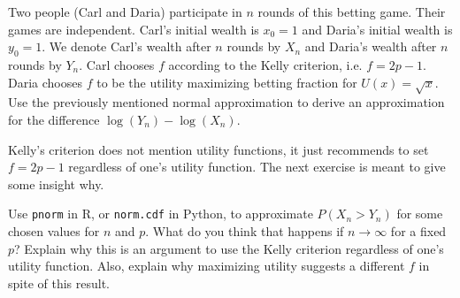 \begin{exercise}
Two people (Carl and Daria) participate in $n$ rounds of this betting game. Their games are independent. Carl's initial wealth is $x_0 = 1$ and Daria's initial wealth is $y_0 = 1$. We denote Carl's wealth after $n$ rounds by $X_n$ and Daria's wealth after $n$ rounds by $Y_n$. Carl chooses $f$ according to the Kelly criterion, i.e. $f = 2p-1$.  Daria chooses $f$ to be the  utility maximizing betting fraction for  $U(x) = \sqrt{x}$.
Use the previously mentioned normal approximation to derive an approximation for the difference $\log(Y_n) - \log(X_n)$.
\end{exercise}

Kelly's criterion does not mention utility functions, it just recommends to set $f = 2p-1$ regardless of one's utility function. The next exercise is meant to give some insight why.


\begin{exercise}
Use \texttt{pnorm} in R, or \texttt{norm.cdf} in Python, to approximate $P(X_n > Y_n)$ for some chosen values for $n$ and $p$. What do you think that happens if $n \to \infty$ for a fixed $p$? Explain why this is an argument to use the Kelly criterion  regardless of one's utility function. Also, explain why maximizing utility suggests a different $f$ in spite of this result.
\end{exercise}
